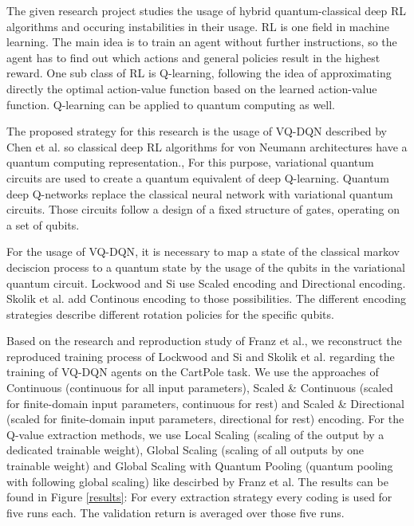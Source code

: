 The given research project studies the usage of hybrid quantum-classical deep \ac{RL} algorithms and occuring instabilities in their usage.
\ac{RL} is one field in machine learning.
The main idea is to train an agent without further instructions, so the agent has to find out which actions and general policies result in the highest reward.
One sub class of \ac{RL} is Q-learning, following the idea of approximating directly the optimal action-value function based on the learned action-value function.\autocite{rl} 
Q-learning can be applied to quantum computing as well.


The proposed strategy for this research is the usage of \ac{VQ-DQN} described by Chen et al. so classical deep \ac{RL} algorithms for von Neumann architectures have a quantum computing representation.\autocite{vqdqn},
For this purpose, variational quantum circuits are used to create a quantum equivalent of deep Q-learning.
Quantum deep Q-networks replace the classical neural network with variational quantum circuits.
Those circuits follow a design of a fixed structure of gates, operating on a set of qubits.\autocite{circuits}


For the usage of \ac{VQ-DQN}, it is necessary to map a state of the classical markov deciscion process to a quantum state by the usage of the qubits in the variational quantum circuit. 
Lockwood and Si use Scaled encoding and Directional encoding.\autocite{lockwood}
Skolik et al. add Continous encoding to those possibilities.\autocite{skolik} 
The different encoding strategies describe different rotation policies for the specific qubits.


Based on the research and reproduction study of Franz et al., we reconstruct the reproduced training process of Lockwood and Si and Skolik et al. regarding the training of \ac{VQ-DQN} agents on the CartPole task. 
We use the approaches of Continuous (continuous for all input parameters), Scaled \& Continuous (scaled for finite-domain input parameters, continuous for rest) and Scaled \& Directional (scaled for finite-domain input parameters, directional for rest) encoding. 
For the Q-value extraction methods, we use Local Scaling (scaling of the output by a dedicated trainable weight), Global Scaling (scaling of all outputs by one trainable weight) and Global Scaling with Quantum Pooling (quantum pooling with following global scaling) like descirbed by Franz et al.
The results can be found in Figure \ref{results}: For every extraction strategy every coding is used for five runs each.
The validation return is averaged over those five runs.

